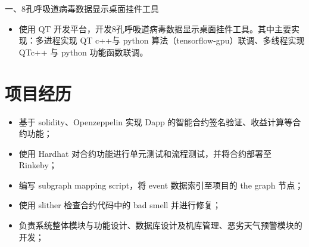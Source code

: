 \documentclass{resume}
\begin{document}
一、8孔呼吸道病毒数据显示桌面挂件工具
\begin{itemize}[parsep=0.5ex]
  \item 使用 QT 开发平台，开发8孔呼吸道病毒数据显示桌面挂件工具。其中主要实现：多进程实现 QT c++与 python 算法（tensorflow-gpu）联调、多线程实现 QTc++ 与 python 功能函数联调。
\end{itemize}

\section{项目经历}
\begin{itemize}[parsep=0.5ex]
  \item 基于 solidity、Openzeppelin 实现 Dapp 的智能合约签名验证、收益计算等合约功能；
  \item 使用 Hardhat 对合约功能进行单元测试和流程测试，并将合约部署至 Rinkeby；
  \item 编写 subgraph mapping script，将 event 数据索引至项目的 the graph 节点；
  \item 使用 slither 检查合约代码中的 bad smell 并进行修复；
\end{itemize}
\begin{itemize}[parsep=0.5ex]
  \item 负责系统整体模块与功能设计、数据库设计及机库管理、恶劣天气预警模块的开发；
\end{itemize}
\end{document}
